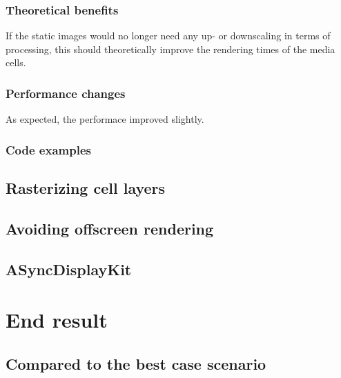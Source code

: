 \documentclass[a4paper,12pt]{article}
\begin{document}
\subsubsection*{Theoretical benefits}
If the static images would no longer need any up- or downscaling in terms of processing, this should theoretically improve the rendering times of the media cells.

\subsubsection*{Performance changes}
As expected, the performace improved slightly.


\subsubsection*{Code examples}

\subsection{Rasterizing cell layers}

\subsection{Avoiding offscreen rendering}

\subsection{ASyncDisplayKit}

\newpage
\section{End result}
\subsection{Compared to the best case scenario}
\end{document}
